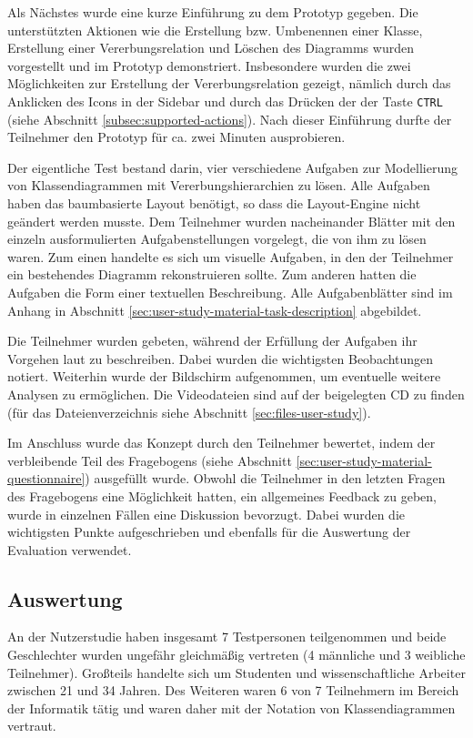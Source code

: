 Als Nächstes wurde eine kurze Einführung zu dem Prototyp gegeben. Die unterstützten Aktionen wie die Erstellung bzw. Umbenennen einer Klasse, Erstellung einer Vererbungsrelation und Löschen des Diagramms wurden vorgestellt und im Prototyp demonstriert. Insbesondere wurden die zwei Möglichkeiten zur Erstellung der Vererbungsrelation gezeigt, nämlich durch das Anklicken des Icons in der Sidebar und durch das Drücken der der Taste \texttt{CTRL} (siehe Abschnitt \ref{subsec:supported-actions}). Nach dieser Einführung durfte der Teilnehmer den Prototyp für ca. zwei Minuten ausprobieren.

Der eigentliche Test bestand darin, vier verschiedene Aufgaben zur Modellierung von Klassendiagrammen mit Vererbungshierarchien zu lösen. Alle Aufgaben haben das baumbasierte Layout benötigt, so dass die Lay\-out-Engine nicht geändert werden musste. Dem Teilnehmer wurden nacheinander Blätter mit den einzeln ausformulierten Aufgabenstellungen vorgelegt, die von ihm zu lösen waren. Zum einen handelte es sich um visuelle Aufgaben, in den der Teilnehmer ein bestehendes Diagramm rekonstruieren sollte. Zum anderen hatten die Aufgaben die Form einer textuellen Beschreibung. Alle Aufgabenblätter sind im Anhang in Abschnitt \ref{sec:user-study-material-task-description} abgebildet.

Die Teilnehmer wurden gebeten, während der Erfüllung der Aufgaben ihr Vorgehen laut zu beschreiben. Dabei wurden die wichtigsten Beobachtungen notiert. Weiterhin wurde der Bildschirm aufgenommen, um eventuelle weitere Analysen zu ermöglichen. Die Videodateien sind auf der beigelegten CD zu finden (für das Dateienverzeichnis siehe Abschnitt \ref{sec:files-user-study}).

Im Anschluss wurde das Konzept durch den Teilnehmer bewertet, indem der verbleibende Teil des Fragebogens (siehe Abschnitt \ref{sec:user-study-material-questionnaire}) ausgefüllt wurde. Obwohl die Teilnehmer in den letzten Fragen des Fragebogens eine Möglichkeit hatten, ein allgemeines Feedback zu geben, wurde in einzelnen Fällen eine Diskussion bevorzugt. Dabei wurden die wichtigsten Punkte aufgeschrieben und ebenfalls für die Auswertung der Evaluation verwendet.

\subsection{Auswertung}
\label{subsec:user-study-evaluation}

An der Nutzerstudie haben insgesamt 7 Testpersonen teilgenommen und beide Geschlechter wurden ungefähr gleichmäßig vertreten (4 männliche und 3 weibliche Teilnehmer). Großteils handelte sich um Studenten und wissenschaftliche Arbeiter zwischen 21 und 34 Jahren. Des Weiteren waren 6 von 7 Teilnehmern im Bereich der Informatik tätig und waren daher mit der Notation von Klassendiagrammen vertraut.

